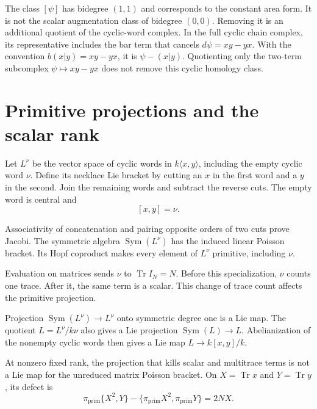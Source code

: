 The class $[\psi]$ has bidegree $(1,1)$ and corresponds to
the constant area form. It is not the scalar augmentation
class of bidegree $(0,0)$. Removing it is an additional
quotient of the cyclic-word complex. In the full cyclic
chain complex, its representative includes the bar term
that cancels $d\psi=xy-yx$. With the convention
$b(x|y)=xy-yx$, it is $\psi-(x|y)$. Quotienting only the
two-term subcomplex $\psi\mapsto xy-yx$ does not remove
this cyclic homology class.

\section{Primitive projections and the scalar rank}

Let $L^\nu$ be the vector space of cyclic words in
$k\langle x,y\rangle$, including the empty cyclic word
$\nu$. Define its necklace Lie bracket by cutting an $x$ in the first
word and a $y$ in the second. Join the remaining words and
subtract the reverse cuts. The empty word is
central and
\[
 [x,y]=\nu.
\]

Associativity of concatenation and pairing opposite orders
of two cuts prove Jacobi. The symmetric algebra
$\operatorname{Sym}(L^\nu)$ has the induced linear Poisson
bracket. Its Hopf coproduct makes every element of $L^\nu$
primitive, including $\nu$.

Evaluation on matrices sends $\nu$ to $\operatorname{Tr}I_N=N$.
Before this specialization, $\nu$ counts one trace. After it,
the same term is a scalar. This change of trace count affects
the primitive projection.

\begin{proposition}\label{mht:prop:primitive-rank-bracket}
Projection $\operatorname{Sym}(L^\nu)\to L^\nu$ onto symmetric
degree one is a Lie map. The quotient $L=L^\nu/k\nu$ also
gives a Lie projection $\operatorname{Sym}(L)\to L$.
Abelianization of the nonempty cyclic words then gives a
Lie map $L\to k[x,y]/k$.

At nonzero fixed rank, the projection that kills scalar and
multitrace terms is not a Lie map for the unreduced matrix
Poisson bracket. On $X=\operatorname{Tr}x$ and
$Y=\operatorname{Tr}y$, its defect is
\begin{equation}\label{mht:eq:primitive-rank-defect}
 \pi_{\mathrm{prim}}\{X^2,Y\}
 -\{\pi_{\mathrm{prim}}X^2,\pi_{\mathrm{prim}}Y\}
                         =2N X.
\end{equation}
\end{proposition}

